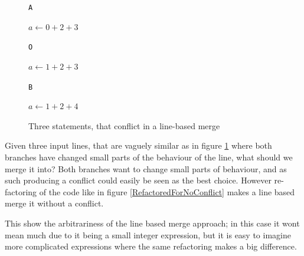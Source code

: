\documentclass[11pt]{article}
\begin{document}
\begin{figure}

\begin{multicols*}{3}

\texttt{A}

\begin{algorithmic}
	\State $a \gets 0+2+3$
\end{algorithmic}

\columnbreak

\texttt{O}

\begin{algorithmic}
	\State $a \gets 1+2+3$
\end{algorithmic}

\columnbreak

\texttt{B}
 
\begin{algorithmic}
	\State $a \gets 1+2+4$
\end{algorithmic}

\end{multicols*}
\caption{Three statements, that conflict in a line-based merge}
\label{ConflictingLines}

\end{figure}

Given three input lines, that are vaguely similar as in figure \ref{ConflictingLines} where both branches have changed small parts of the behaviour of the line, what should we merge it into? Both branches want to change small parts of behaviour, and as such producing a conflict could easily be seen as the best choice. However re-factoring of the code like in figure \ref{RefactoredForNoConflict} makes a line based merge it without a conflict.

This show the arbitrariness of the line based merge approach; in this case it wont mean much due to it being a small integer expression, but it is easy to imagine more complicated expressions where the same refactoring makes a big difference. 

\end{document}
